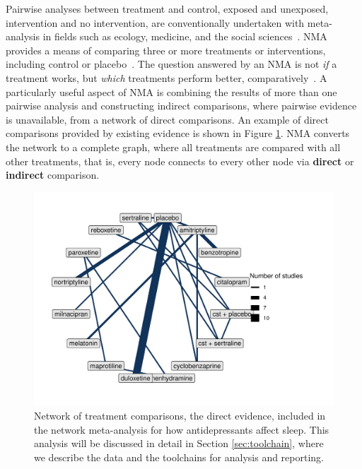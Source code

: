 \documentclass[AMA,STIX1COL]{WileyNJD-v2}\usepackage[]{graphicx}\usepackage[]{color}
\makeatletter
\def\maxwidth{ %
  \ifdim\Gin@nat@width>\linewidth
    \linewidth
  \else
    \Gin@nat@width
  \fi
}
\newenvironment{knitrout}{}{} %
\makeatother
\begin{document}
Pairwise analyses between treatment and control, exposed and unexposed, intervention and no intervention, are conventionally undertaken with meta-analysis in fields such as ecology, medicine, and the social sciences~\cite{borenstein_introduction_2011}. NMA provides a means of comparing three or more treatments or interventions, including control or placebo~\cite{higgins2019cochrane}. The question answered by an NMA is not \emph{if} a treatment works, but \emph{which} treatments perform better, comparatively~\cite{harrer_doing_2019}. A particularly useful aspect of NMA is combining the results of more than one pairwise analysis and constructing indirect comparisons, where pairwise evidence is unavailable, from a network of direct comparisons. An example of direct comparisons provided by existing evidence is shown in Figure \ref{fig:network}. NMA converts the network to a complete graph, where all treatments are compared with all other treatments, that is, every node connects to every other node via \textbf{direct} or \textbf{indirect} comparison.

\begin{figure}


\begin{knitrout}
\color{fgcolor}
\includegraphics[width=\maxwidth]{figure/r_network-1} 

\end{knitrout}


\caption{Network of treatment comparisons, the direct evidence, included in the network meta-analysis for how antidepressants affect sleep. This analysis will be discussed in detail in Section \ref{sec:toolchain}, where we describe the data and the toolchains for analysis and reporting.}
\label{fig:network}
\end{figure}
\end{document}
